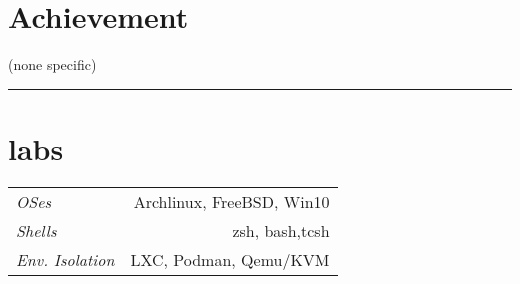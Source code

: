 \documentclass[12pt]{res}
\begin{document}
\begin{resume}
\begin{minipage}[t]{0.42\linewidth}
	\section{Achievement}
	\begin{flushleft}
        \begin{itemize}
		\footnotesize{(none specific)}
        \end{itemize}
	\end{flushleft}
\end{minipage}

\vspace{10pt}
\rule{1.0\textwidth}{0.1pt}

\begin{minipage}[t]{0.25\linewidth}
	\section{labs}
	\footnotesize{
		\begin{tabular}{lr}
			\emph{OSes} & Archlinux, FreeBSD, Win10\\
			\emph{Shells} & zsh, bash,tcsh\\
			\emph{Env. Isolation} & LXC, Podman, Qemu/KVM\\
		\end{tabular}
	}
\end{minipage}

\end{resume} 
\end{document}
